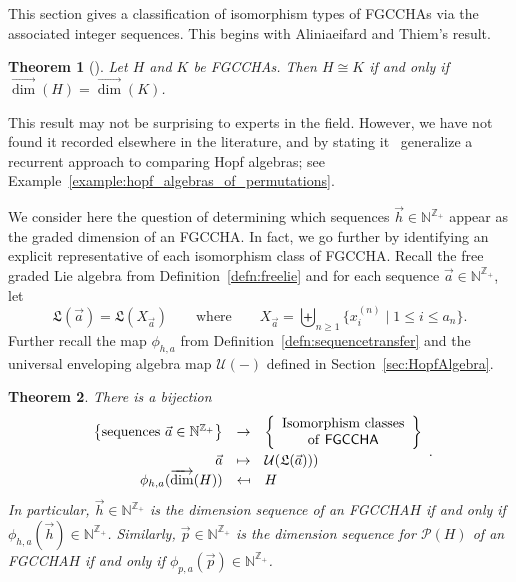 \documentclass[11pt]{amsart}
\newtheorem{theorem}{Theorem}[section]
\theoremstyle{definition}
\numberwithin{equation}{section}
\def\NN{{\mathbb N}}
\def\ZZ{{\mathbb Z}}
\newcommand{\FGCCHA}{\textsf{FGCCHA}\xspace}
\newcommand{\FGCCHAs}{\textsf{FGCCHA}s\xspace}
\newcommand{\vecdim}{\overrightarrow{\dim}}
\newcommand{\lucas}[1]{\todo[size=\tiny,color=red!50]{#1 \\ \hfill --- Lucas}}
\begin{document}
This section gives a classification of isomorphism types of \FGCCHAs via the associated integer sequences.  
This begins with Aliniaeifard and Thiem's result.

\begin{theorem}[{\cite[Theorem 4.2]{AT22}}]
\label{thm:AT}
Let $H$ and $K$ be \FGCCHAs.  Then $H \cong K$ if and only if $\vecdim(H) = \vecdim(K)$.
\end{theorem}

This result may not be surprising to experts in the field.  
However, we have not found it recorded elsewhere in the literature, and by stating it~\cite{AT22} generalize a recurrent approach to comparing Hopf algebras; see Example~\ref{example:hopf_algebras_of_permutations}.

We consider here the question of determining which sequences $\vec{h} \in \NN^{\ZZ_+}$
appear as the graded dimension of an \FGCCHA.  In fact,
we go further by identifying an explicit representative of each isomorphism class of \FGCCHA.  
Recall the free graded Lie algebra from Definition~\ref{defn:freelie} and for each sequence $\vec{a} \in \NN^{\ZZ_{+}}$, let
\begin{equation}
\label{eq:La}
\mathfrak{L}(\vec{a}) = \mathfrak{L}(X_{\vec{a}}) \qquad\text{where}\qquad X_{\vec{a}} = \biguplus_{n \ge 1} \{x^{(n)}_{i} \;|\; 1 \le i \le a_{n}\}.
\end{equation}
Further recall the map $\phi_{h, a}$ from
Definition~\ref{defn:sequencetransfer} and the universal enveloping
algebra map $\mathcal{U}(-)$ defined in Section~\ref{sec:HopfAlgebra}.

\begin{theorem}
\label{thm:a sequence}
There is a bijection
\[
\begin{array}{rcl}
\left\{ \text{sequences }\vec{a} \in \NN^{\ZZ_+} \right\} & \to & \left\{ \begin{array}{c} \text{Isomorphism classes} \\ \text{of \FGCCHA} \end{array} \right\} \\[2ex]
\vec{a} & \mapsto & \mathcal{U}(\mathfrak{L}(\vec{a}))) \\
\phi_{h,a}(\vecdim(H)) & \mapsfrom & H
\end{array}.
\]
In particular, $\vec{h} \in \NN^{\ZZ_+}$ is the dimension sequence of an \FGCCHA $H$ if and only if $\phi_{h, a}(\vec{h}) \in \NN^{\ZZ_+}$.  
Similarly, $\vec{p} \in \NN^{\ZZ_{+}}$ is the dimension sequence for $\mathcal{P}(H)$ of an \FGCCHA $H$ if and only if $\phi_{p, a}(\vec{p}) \in \NN^{\ZZ_{+}}$.
\end{theorem}
\end{document}
